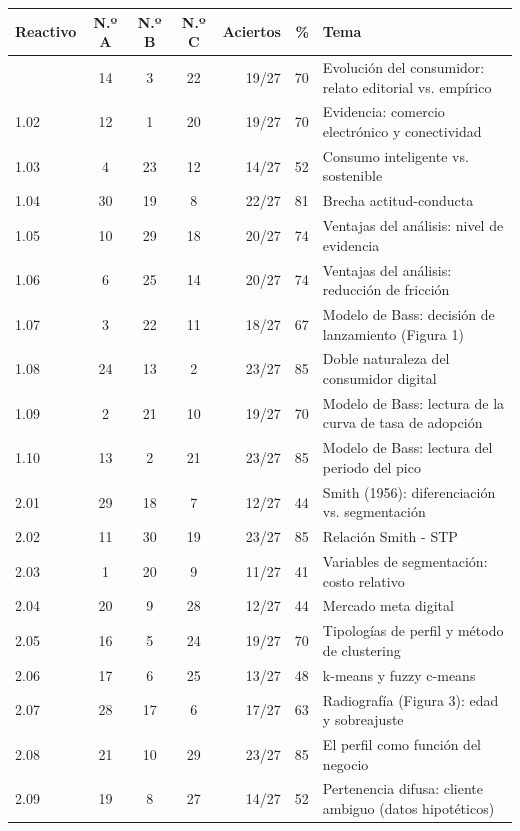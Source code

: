 \documentclass[10pt,letterpaper]{article}
\begin{document}
{\scriptsize\renewcommand{\arraystretch}{1.1}\setlength{\tabcolsep}{3pt}
\begin{longtable}{@{}l c c c r r l@{}}\toprule
\textbf{Reactivo} & \textbf{N.º A} & \textbf{N.º B} & \textbf{N.º C} & \textbf{Aciertos} & \textbf{\%} & \textbf{Tema}\\\midrule\endhead\bottomrule\endfoot
1.01 & 14 & 3 & 22 & 19/27 & 70 & Evolución del consumidor: relato editorial vs. empírico\\
1.02 & 12 & 1 & 20 & 19/27 & 70 & Evidencia: comercio electrónico y conectividad\\
1.03 & 4 & 23 & 12 & 14/27 & 52 & Consumo inteligente vs. sostenible\\
1.04 & 30 & 19 & 8 & 22/27 & 81 & Brecha actitud-conducta\\
1.05 & 10 & 29 & 18 & 20/27 & 74 & Ventajas del análisis: nivel de evidencia\\
1.06 & 6 & 25 & 14 & 20/27 & 74 & Ventajas del análisis: reducción de fricción\\
1.07 & 3 & 22 & 11 & 18/27 & 67 & Modelo de Bass: decisión de lanzamiento (Figura 1)\\
1.08 & 24 & 13 & 2 & 23/27 & \cellcolor{verde!12}85 & Doble naturaleza del consumidor digital\\
1.09 & 2 & 21 & 10 & 19/27 & 70 & Modelo de Bass: lectura de la curva de tasa de adopción\\
1.10 & 13 & 2 & 21 & 23/27 & \cellcolor{verde!12}85 & Modelo de Bass: lectura del periodo del pico\\
\midrule
2.01 & 29 & 18 & 7 & 12/27 & 44 & Smith (1956): diferenciación vs. segmentación\\
2.02 & 11 & 30 & 19 & 23/27 & \cellcolor{verde!12}85 & Relación Smith - STP\\
2.03 & 1 & 20 & 9 & 11/27 & 41 & Variables de segmentación: costo relativo\\
2.04 & 20 & 9 & 28 & 12/27 & 44 & Mercado meta digital\\
2.05 & 16 & 5 & 24 & 19/27 & 70 & Tipologías de perfil y método de clustering\\
2.06 & 17 & 6 & 25 & 13/27 & 48 & k-means y fuzzy c-means\\
2.07 & 28 & 17 & 6 & 17/27 & 63 & Radiografía (Figura 3): edad y sobreajuste\\
2.08 & 21 & 10 & 29 & 23/27 & \cellcolor{verde!12}85 & El perfil como función del negocio\\
2.09 & 19 & 8 & 27 & 14/27 & 52 & Pertenencia difusa: cliente ambiguo (datos hipotéticos)\\

\end{longtable}}
\end{document}
